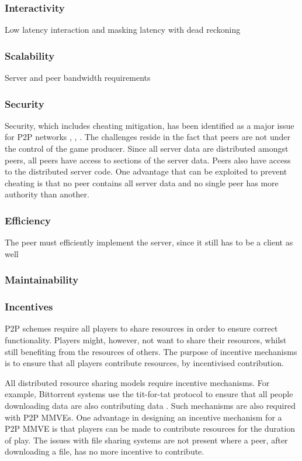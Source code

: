 \subsubsection{Interactivity}
Low latency interaction and masking latency with dead reckoning

\subsubsection{Scalability}
Server and peer bandwidth requirements

\subsubsection{Security}

Security, which includes cheating mitigation, has been identified as a major issue for P2P networks \cite{knutsson_p2p_first}, \cite{challenges_p2p_gaming}, \cite{cheat_proof_event_ordering}. The challenges reside in the fact that peers are not under the control of the game producer. Since all server data are distributed amongst peers, all peers have access to sections of the server data. Peers also have access to the distributed server code. One advantage that can be exploited to prevent cheating is that no peer contains all server data and no single peer has more authority than another.

\subsubsection{Efficiency}
The peer must efficiently implement the server, since it still has to be a client as well

\subsubsection{Maintainability}

\subsubsection{Incentives}

P2P schemes require all players to share resources in order to ensure correct functionality. Players might, however, not want to share their resources, whilst still benefiting from the resources of others. The purpose of incentive mechanisms is to ensure that all players contribute resources, by incentivised contribution.

All distributed resource sharing models require incentive mechanisms. For example, Bittorrent systems use the tit-for-tat protocol to ensure that all people downloading data are also contributing data \cite{tit_for_tat}. Such mechanisms are also required with P2P MMVEs. One advantage in designing an incentive mechanism for a P2P MMVE is that players can be made to contribute resources for the duration of play. The issues with file sharing systems are not present where a peer, after downloading a file, has no more incentive to contribute.

